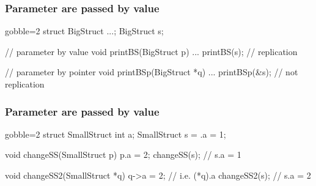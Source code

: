\begin{frame}[fragile]
  \frametitle{Parameter are passed by value}
  \begin{multicols}{2}
    \begin{cppcode*}{gobble=2}
      struct BigStruct {...};
      BigStruct s;
      
      // parameter by value
      void printBS(BigStruct p) {
        ...
      }
      printBS(s); // replication
      
      // parameter by pointer
      void printBSp(BigStruct *q) {
        ...
      }
      printBSp(&s); // not replication
    \end{cppcode*}
    \columnbreak
    \null \vfill
    \vfill \null
  \end{multicols}
\end{frame}

\begin{frame}[fragile]
  \frametitle{Parameter are passed by value}
  \begin{multicols}{2}
    \begin{cppcode*}{gobble=2}
      struct SmallStruct {int a};
      SmallStruct s = {.a = 1};
      
      void changeSS(SmallStruct p) {
        p.a = 2;
      }
      changeSS(s);
      // s.a = 1
      
      void changeSS2(SmallStruct *q) {
        q->a = 2;  // i.e. (*q).a
      }
      changeSS2(s);
      // s.a = 2
    \end{cppcode*}
    \columnbreak
    \null \vfill
    \vfill \null
  \end{multicols}
\end{frame}

